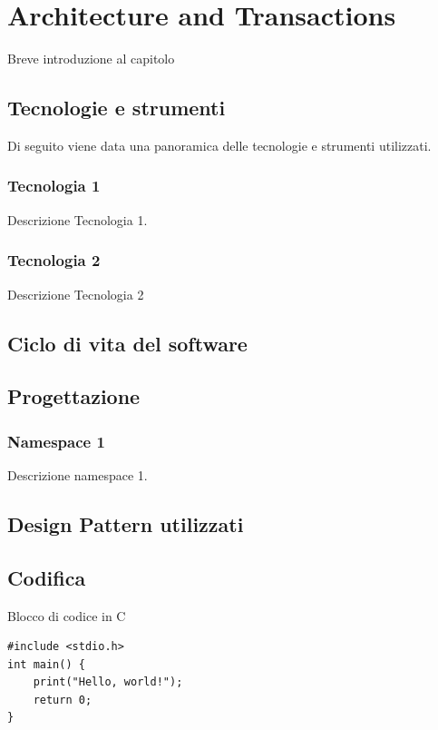 \chapter{Architecture and Transactions}
\label{chap:transactions}
Breve introduzione al capitolo

\section{Tecnologie e strumenti}
\label{sec:tecnologie-strumenti}
Di seguito viene data una panoramica delle tecnologie e strumenti utilizzati.

\subsection*{Tecnologia 1}
Descrizione Tecnologia 1.

\subsection*{Tecnologia 2}
Descrizione Tecnologia 2

\section{Ciclo di vita del software}
\label{sec:ciclo-vita-software}

\section{Progettazione}
\label{sec:progettazione}

\subsection{Namespace 1}
Descrizione namespace 1.

\section{Design Pattern utilizzati}

\section{Codifica}
Blocco di codice in C
\begin{listing}[H]
\begin{verbatim}
#include <stdio.h>
int main() {
    print("Hello, world!");
    return 0;
}
\end{verbatim}
\caption{Example of code}
\label{listing:c}
\end{listing}

\newpage